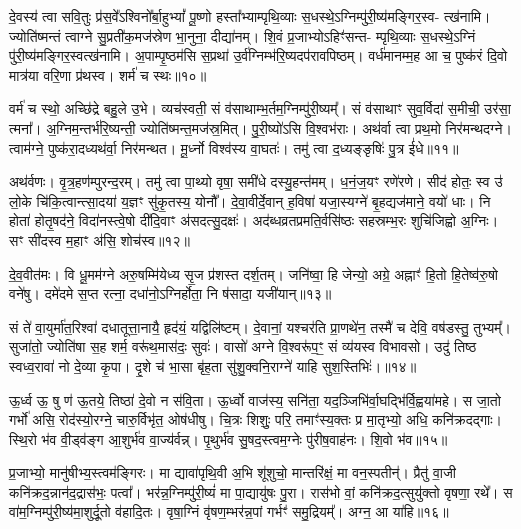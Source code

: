 दे॒वस्य॑ त्वा सवि॒तुः प्र॑स॒वे᳚\-ऽश्विनो᳚र्बा॒हु\-भ्यां᳚ पू॒ष्णो हस्ता᳚भ्याम्पृथि॒व्याः स॒धस्थे॒\-ऽग्निम्पु॑री॒ष्य॑मङ्गिर॒स्व- त्ख॑नामि। ज्योति॑ष्मन्तं त्वाग्ने सु॒प्रती॑क॒मज॑स्रेण भा॒नुना॒ दीद्या॑नम्। शि॒वं प्र॒जाभ्यो\-ऽहिꣳ॑सन्त- म्पृथि॒व्याः स॒धस्थे॒\-ऽग्निं पु॑री॒ष्य॑मङ्गिर॒स्वत्ख॑नामि। अ॒पाम्पृ॒ष्ठम॑सि स॒प्रथा॑ उ॒र्व॑ग्निम्भ॑रि॒ष्यदप॑रावपिष्ठम्। वर्ध॑मानम्म॒ह आ च॒ पुष्क॑रं दि॒वो मात्र॑या वरि॒णा प्र॑थस्व। शर्म॑ च स्थः॥१०॥

वर्म॑ च स्थो॒ अच्छि॑द्रे बहु॒ले उ॒भे। व्यच॑स्वती॒ सं व॑साथाम्भ॒र्तम॒ग्निम्पु॑री॒ष्यम्᳚। सं व॑साथाꣳ सुव॒र्विदा॑ स॒मीची॒ उर॑सा॒ त्मना᳚। अ॒ग्निम॒न्तर्भ॑रि॒ष्यन्ती॒ ज्योति॑ष्मन्त॒मज॑स्र॒मित्। पु॒री॒ष्यो॑\-ऽसि वि॒श्वभ॑राः। अथ॑र्वा त्वा प्रथ॒मो निर॑मन्थदग्ने। त्वाम॑ग्ने॒ पुष्क॑रा॒दध्यथ॑र्वा॒ निर॑मन्थत। मू॒र्ध्नो विश्व॑स्य वा॒घतः॑। तमु॑ त्वा द॒ध्यङ्ङृषिः॑ पु॒त्र ई॑धे॥११॥

अथ॑र्वणः। वृ॒त्र॒हण॑म्पुरन्द॒रम्। तमु॑ त्वा पा॒थ्यो वृषा॒ समी॑धे दस्यु॒हन्त॑मम्। ध॒नं॒ज॒यꣳ रणे॑रणे। सीद॑ होतः॒ स्व उ॑ लो॒के चि॑कि॒त्वान्त्सा॒दया॑ य॒ज्ञꣳ सु॑कृ॒तस्य॒ योनौ᳚। दे॒वा॒वीर्दे॒वान् ह॒विषा॑ यजा॒स्यग्ने॑ बृ॒हद्यज॑माने॒ वयो॑ धाः। नि होता॑ होतृ॒षद॑ने॒ विदा॑नस्त्वे॒षो दी॑दि॒वाꣳ अ॑सदत्सु॒दक्षः॑। अद॑ब्धव्रतप्रमति॒र्वसि॑ष्ठः सहस्रम्भ॒रः शुचि॑जिह्वो अ॒ग्निः। सꣳ सी॑दस्व म॒हाꣳ अ॑सि॒ शोच॑स्व॥१२॥

दे॒व॒वीत॑मः। वि धू॒मम॑ग्ने अरु॒षम्मि॑येध्य सृ॒ज प्र॑शस्त दर्\mbox{}श॒तम्। जनि॑ष्वा॒ हि जेन्यो॒ अग्रे॒ अह्नाꣳ॑ हि॒तो हि॒तेष्व॑रु॒षो वने॑षु। दमे॑दमे स॒प्त रत्ना॒ दधा॑नो॒\-ऽग्निर्\mbox{}होता॒ नि ष॑सादा॒ यजी॑यान्॥१३॥

{\anuvakamend[{स्थ॒ ई॒धे॒ शोच॑स्व स॒प्तविꣳ॑शतिश्च॥३॥}]}

सं ते॑ वा॒युर्मा॑त॒रिश्वा॑ दधातूत्ता॒नायै॒ हृद॑यं॒ यद्विलि॑ष्टम्। दे॒वानां॒ यश्चर॑ति प्रा॒णथे॑न॒ तस्मै॑ च देवि॒ वष॑डस्तु॒ तुभ्यम्᳚। सुजा॑तो॒ ज्योति॑षा स॒ह शर्म॒ वरू॑थ॒मास॑दः॒ सुवः॑। वासो॑ अग्ने वि॒श्वरू॑प॒ꣳ॒ सं व्य॑यस्व विभावसो। उदु॑ तिष्ठ स्वध्व॒रावा॑ नो दे॒व्या कृ॒पा। दृ॒शे च॑ भा॒सा बृ॑ह॒ता सु॑शु॒क्वनि॒राग्ने॑ याहि सुश॒स्तिभिः॑।॥१४॥

ऊ॒र्ध्व ऊ॒ षु ण॑ ऊ॒तये॒ तिष्ठा॑ दे॒वो न स॑वि॒ता। ऊ॒र्ध्वो वाज॑स्य॒ सनि॑ता॒ यद॒ञ्जिभि॑र्वा॒घद्भि॑र्वि॒ह्वया॑महे। स जा॒तो गर्भो॑ असि॒ रोद॑स्यो॒रग्ने॒ चारु॒र्विभृ॑त॒ ओष॑धीषु। चि॒त्रः शिशुः॒ परि॒ तमाꣳ॑स्य॒क्तः प्र मा॒तृभ्यो॒ अधि॒ कनि॑क्रदद्गाः। स्थि॒रो भ॑व वी॒ड्व॑ङ्ग आ॒शुर्भ॑व वा॒ज्य॑र्वन्न्। पृ॒थुर्भ॑व सु॒षद॒स्त्वम॒ग्नेः पु॑रीष॒वाह॑नः। शि॒वो भ॑व॥१५॥

प्र॒जाभ्यो॒ मानु॑षीभ्य॒स्त्वम॑ङ्गिरः। मा द्यावा॑पृथि॒वी अ॒भि शू॑शुचो॒ मान्तरि॑क्षं॒ मा वन॒स्पतीन्॑। प्रैतु॑ वा॒जी कनि॑क्रद॒न्नान॑द॒द्रास॑भः॒ पत्वा᳚। भर॑न्न॒ग्निम्पु॑री॒ष्यं॑ मा पा॒द्यायु॑षः पु॒रा। रास॑भो वां॒ कनि॑क्रद॒त्सुयु॑क्तो वृषणा॒ रथे᳚। स वा॑म॒ग्निम्पु॑री॒ष्य॑मा॒शुर्दू॒तो व॑हादि॒तः। वृषा॒ग्निं वृ॑षण॒म्भर॑न्न॒पां गर्भꣳ॑ समु॒द्रियम्᳚। अग्न॒ आ या॑हि॥१६॥

